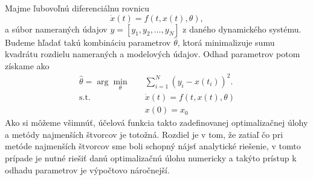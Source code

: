 Majme ľubovoľnú diferenciálnu rovnicu
\begin{equation}
	\dot{x}(t) = f\left( t, x(t), \theta \right),
\end{equation} 
a súbor nameraných údajov $ y = [y_1, y_2, \dots , y_N] $ z daného dynamického systému. Budeme hľadať takú kombináciu parametrov $ \hat{\theta} $, ktorá minimalizuje sumu kvadrátu rozdielu nameraných a modelových údajov. Odhad parametrov potom získame ako
\begin{equation}
	\begin{split}
		\hat{\theta} = \arg \min_{\theta} \quad & \sum_{i=1}^{N} \left(y_{i} - x(t_{i})\right)^2. \\
		\textrm{s.t.} \quad & \dot{x}(t) = f\left(t,x(t),\theta \right)\\
		 & x(0) = x_0
	\end{split}
	\label{eq:param_est_opt_form}
\end{equation} 
Ako si môžeme všimnúť, účelová funkcia takto zadefinovanej optimalizačnej úlohy a metódy najmenších štvorcov je totožná. Rozdiel je v tom, že zatiaľ čo pri metóde najmenších štvorcov sme boli schopný nájsť analytické riešenie, v tomto prípade je nutné riešiť danú optimalizačnú úlohu numericky a takýto prístup k odhadu parametrov je výpočtovo náročnejší.

